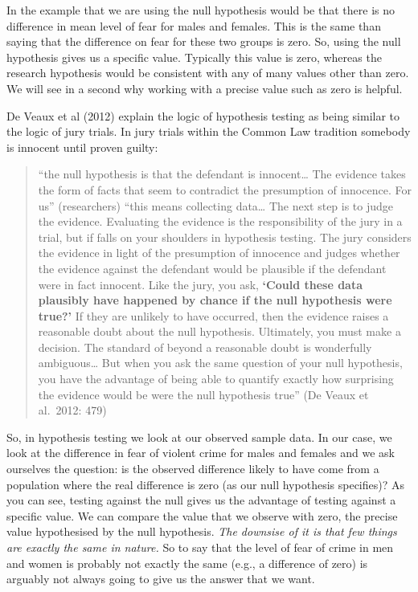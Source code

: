 \documentclass[
]{book}
\begin{document}
In the example that we are using the null hypothesis would be that there is no difference in mean level of fear for males and females. This is the same than saying that the difference on fear for these two groups is zero. So, using the null hypothesis gives us a specific value. Typically this value is zero, whereas the research hypothesis would be consistent with any of many values other than zero. We will see in a second why working with a precise value such as zero is helpful.

De Veaux et al (2012) explain the logic of hypothesis testing as being similar to the logic of jury trials. In jury trials within the Common Law tradition somebody is innocent until proven guilty:

\begin{quote}
``the null hypothesis is that the defendant is innocent\ldots{} The evidence takes the form of facts that seem to contradict the presumption of innocence. For us'' (researchers) ``this means collecting data\ldots{} The next step is to judge the evidence. Evaluating the evidence is the responsibility of the jury in a trial, but if falls on your shoulders in hypothesis testing. The jury considers the evidence in light of the presumption of innocence and judges whether the evidence against the defendant would be plausible if the defendant were in fact innocent. Like the jury, you ask, \textbf{`Could these data plausibly have happened by chance if the null hypothesis were true?'} If they are unlikely to have occurred, then the evidence raises a reasonable doubt about the null hypothesis. Ultimately, you must make a decision. The standard of beyond a reasonable doubt is wonderfully ambiguous\ldots{} But when you ask the same question of your null hypothesis, you have the advantage of being able to quantify exactly how surprising the evidence would be were the null hypothesis true'' (De Veaux et al.~2012: 479)
\end{quote}

So, in hypothesis testing we look at our observed sample data. In our case, we look at the difference in fear of violent crime for males and females and we ask ourselves the question: is the observed difference likely to have come from a population where the real difference is zero (as our null hypothesis specifies)? As you can see, testing against the null gives us the advantage of testing against a specific value. We can compare the value that we observe with zero, the precise value hypothesised by the null hypothesis. \emph{The downsise of it is that few things are exactly the same in nature.} So to say that the level of fear of crime in men and women is probably not exactly the same (e.g., a difference of zero) is arguably not always going to give us the answer that we want.
\end{document}

